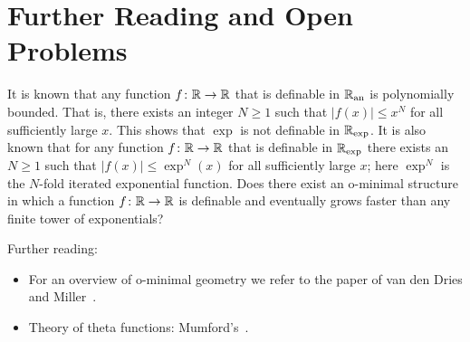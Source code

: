 \section{Further Reading and Open Problems}

It is known that any function $f \colon {\mathbb{R}}\rightarrow{\mathbb{R}}$ that is
definable in ${{\mathbb{R}}_{\mathrm{an}}}$ is polynomially bounded. That is, there exists
an integer $N\ge 1$ such that $|f(x)|\le x^N$ for all sufficiently
large $x$. This shows that $\exp$ is not definable in ${{\mathbb{R}}_{\mathrm{exp}}}$. It is
also known that for any function $f\colon {\mathbb{R}}\rightarrow{\mathbb{R}}$ that is
definable in ${{\mathbb{R}}_{\mathrm{exp}}}$ there exists an $N\ge 1$ such that $|f(x)| \le
\exp^{N}(x)$ for all sufficiently large $x$; here $\exp^{N}$ is the
$N$-fold iterated exponential function. 
Does there exist an o-minimal structure in which a function $f\colon
{\mathbb{R}}\rightarrow{\mathbb{R}}$ is definable and eventually grows faster than any
finite tower of exponentials?

Further reading:
\begin{itemize}
\item For an overview of o-minimal geometry we refer to the paper of
  van den Dries and Miller~\cite{DM:96}.

\item Theory of theta functions: Mumford's~\cite{MumfordTataLectures}.
\end{itemize}

